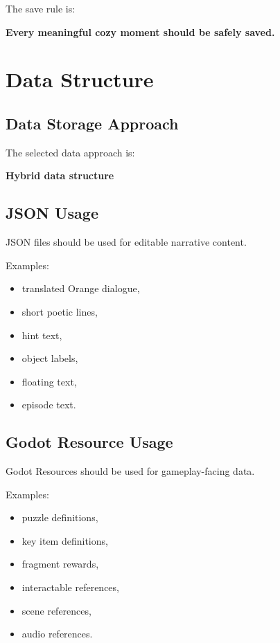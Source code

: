 \documentclass[12pt]{article}
\begin{document}
The save rule is:

\begin{center}
\textbf{Every meaningful cozy moment should be safely saved.}
\end{center}

\section{Data Structure}

\subsection{Data Storage Approach}

The selected data approach is:

\begin{center}
\textbf{Hybrid data structure}
\end{center}

\subsection{JSON Usage}

JSON files should be used for editable narrative content.

Examples:

\begin{itemize}[leftmargin=*]
    \item translated Orange dialogue,
    \item short poetic lines,
    \item hint text,
    \item object labels,
    \item floating text,
    \item episode text.
\end{itemize}

\subsection{Godot Resource Usage}

Godot Resources should be used for gameplay-facing data.

Examples:

\begin{itemize}[leftmargin=*]
    \item puzzle definitions,
    \item key item definitions,
    \item fragment rewards,
    \item interactable references,
    \item scene references,
    \item audio references.
\end{itemize}
\end{document}
